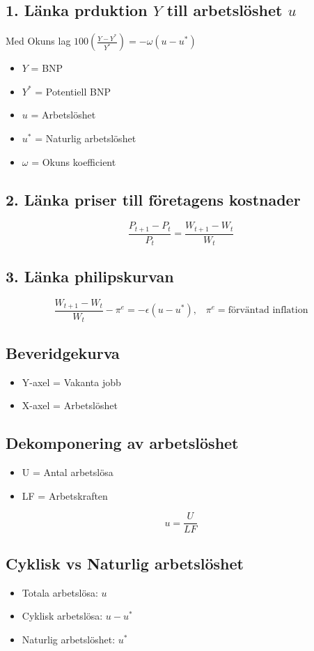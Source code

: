 \documentclass[12pt,a4paper]{article}
\begin{document}
\subsection*{1. Länka prduktion $Y$ till arbetslöshet $u$}
Med Okuns lag $100(\frac{Y-Y^*}{Y^*}) = -\omega (u-u^*)$
\begin{itemize}
    \item $Y$ = BNP
    \item $Y^*$ = Potentiell BNP
    \item $u$ = Arbetslöshet
    \item $u^*$ = Naturlig arbetslöshet
    \item $\omega$ = Okuns koefficient
\end{itemize}

\subsection*{2. Länka priser till företagens kostnader}
$$\frac{P_{t+1} - P_t}{P_t} = \frac{W_{t+1} - W_t}{W_t}$$

\subsection*{3. Länka philipskurvan}
$$\frac{W_{t+1} - W_t}{W_t} - \pi^e = -\epsilon (u - u^*), \hspace{10pt} \pi^e = \text{förväntad inflation}$$

\subsection*{Beveridgekurva}
\begin{itemize}
    \item Y-axel = Vakanta jobb
    \item X-axel = Arbetslöshet
\end{itemize}

\subsection*{Dekomponering av arbetslöshet}
\begin{itemize}
    \item U = Antal arbetslösa
    \item LF = Arbetskraften
\end{itemize}
$$u = \frac{U}{LF}$$

\subsection*{Cyklisk vs Naturlig arbetslöshet}
\begin{itemize}
    \item Totala arbetslösa: $u$
    \item Cyklisk arbetslösa: $u-u^*$
    \item Naturlig arbetslöshet: $u^*$
\end{itemize}
\end{document}
